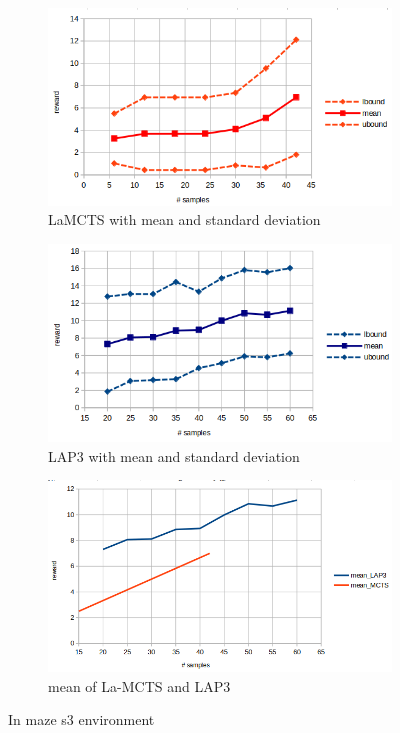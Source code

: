 \documentclass[bibliography=totoc]{scrartcl}
\begin{document}
\begin{figure}[h!]
    \centering
    \begin{subfigure}[b]{0.3\linewidth}
        \includegraphics[width=\linewidth]{img/la-mcts.png}
        \caption{LaMCTS with mean and standard deviation}
    \end{subfigure}
    \hspace{0.02\textwidth}
    \begin{subfigure}[b]{0.3\linewidth}
        \includegraphics[width=\linewidth]{img/LAP3.png}
        \caption{LAP3 with mean and standard deviation}
    \end{subfigure}
    \hspace{0.02\textwidth}
    \begin{subfigure}[b]{0.3\linewidth}
        \includegraphics[width=\linewidth]{img/comparison.png}
        \caption{mean of La-MCTS and LAP3}
    \end{subfigure}
    \caption{In maze s3 environment}
    \label{fig:known_problems}
\end{figure}
\end{document}

